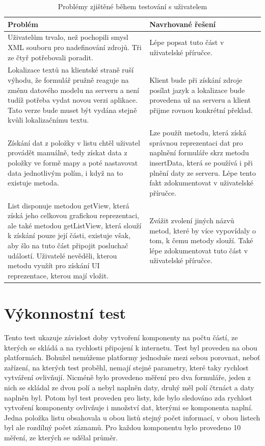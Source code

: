 \begin{table}[h!]
\begin{center}
\caption{Problémy zjištěné během testování s uživatelem}
\label{table:testIssues}
\begin{tabular}{|p{7cm}|p{7cm}|}
\hline
\textbf{Problém} & \textbf{Navrhované řešení} \\
\hline
Uživatelům trvalo, než pochopili smysl XML souboru pro nadefinování zdrojů. Tři ze čtyř potřebovali poradit. & Lépe popsat tuto část v uživatelské příručce. \\
\hline
Lokalizace textů na klientské straně ruší výhodu, že formulář pružně reaguje na změnu datového modelu na serveru a není tudíž potřeba vydat novou verzi aplikace. Tato verze bude muset být vydána stejně kvůli lokalizačnímu textu. & Klient bude při získání zdroje posílat jazyk a lokalizace bude provedena už na serveru a klient přijme rovnou konkrétní překlad. \\
\hline
Získání dat z položky v listu chtěl uživatel provádět manuálně, tedy získat data z položky ve formě mapy a poté nastavovat data jednotlivým polím, i když na to existuje metoda. & Lze použít metodu, která získá správnou reprezentaci dat pro naplnění formuláře skrz metodu insertData, která se používá i při plnění daty ze serveru. Lépe tento fakt zdokumentovat v uživatelské příručce. \\
\hline
List disponuje metodou getView, která získá jeho celkovou grafickou reprezentaci, ale také metodou getListView, která slouží k získání pouze její části, existuje však, aby šlo na tuto část připojit posluchač událostí. Uživatelé nevěděli, kterou metodu využít pro získání UI reprezentace, kterou mají vložit. & Zvážit zvolení jiných názvů metod, které by více vypovídaly o tom, k čemu metody slouží. Také lépe zdokumentovat tuto část v uživatelské příručce. \\
\hline
\end{tabular}
\end{center}
\end{table}

\section{Výkonnostní test} 
Tento test ukazuje závislost doby vytvoření komponenty na počtu částí, ze kterých se skládá a na rychlosti připojení k internetu. Test byl proveden na obou platformách. Bohužel nemůžeme platformy jednoduše mezi sebou porovnat, neboť zařízení, na kterých test proběhl, nemají stejné parametry, které taky rychlost vytváření ovlivňují. Nicméně bylo provedeno měření pro dva formuláře, jeden z nich se skládal ze dvou polí a nebyl naplněn daty, druhý měl polí čtrnáct a daty naplněn byl. Potom byl test proveden pro listy, kde bylo sledováno zda rychlost vytvoření komponenty ovlivňuje i množství dat, kterými se komponenta naplní. Jedna položka listu obsahovala u obou listů stejný počet informací, v obou listech byl ale rozdílný počet záznamů. Pro každou komponentu bylo provedeno 10 měření, ze kterých se udělal průměr. 

